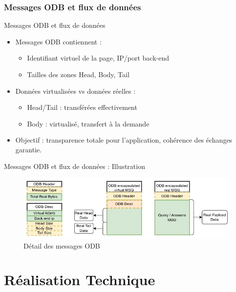 \documentclass[aspectratio=43,8pt]{beamer}
\begin{document}
\section{Messages ODB et flux de données}
\begin{frame}{Messages ODB et flux de données}
\begin{card}
    
    \begin{itemize}
        \item Messages ODB contiennent :
        \begin{itemize}
            \item Identifiant virtuel de la page, IP/port back-end
            \item Tailles des zones Head, Body, Tail
        \end{itemize}
        \item Données virtualisées vs données réelles :
        \begin{itemize}
            \item Head/Tail : transférées effectivement
            \item Body : virtualisé, transfert à la demande
        \end{itemize}
        \item Objectif : transparence totale pour l'application, cohérence des échanges garantie.
    \end{itemize}
\end{card}
\end{frame}

\begin{frame}{Messages ODB et flux de données : Illustration}
    \begin{figure}
        \centering
        \includegraphics[width=\textwidth]{img2/odb_c_messages.jpg}
        \caption{Détail des messages ODB}
    \end{figure}
\end{frame}


\part{Réalisation Technique}
\end{document}
